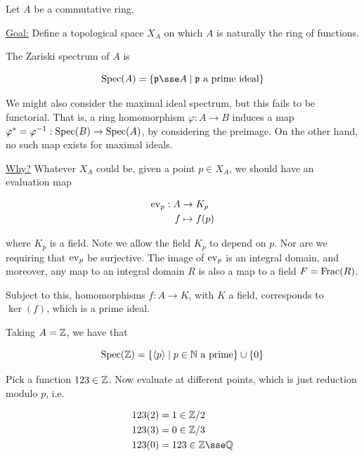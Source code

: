 \documentclass{article}
\newcommand{\set}[1]{\left\{#1\right\}}
\begin{document}
\lec

Let \(A\) be a commutative ring,

\underline{Goal:} Define a topological space \(X_A\) on which \(A\) is naturally the ring of functions.

\begin{definition}
     The Zariski spectrum of \(A\) is

    \[\Spec(A) = \set{\mfp \sse A \mid \mfp \text{ a prime ideal}}\]
\end{definition}

\begin{remark}
    We might also consider the maximal ideal spectrum, but this fails to be functorial. That is, a ring homomorphism \(\varphi: A \to B\) induces a map \(\varphi^* = \varphi^{-1} : \operatorname{Spec}(B) \to \operatorname{Spec}(A)\), by considering the preimage. On the other hand, no such map exists for maximal ideals.
\end{remark}

\underline{Why?} Whatever \(X_A\) could be, given a point \(p \in X_A\), we should have an evaluation map

\begin{align*}
    \mathrm{ev}_p : A &\to K_p \\
    f &\mapsto f(p)
\end{align*}

where \(K_p\) is a field. Note we allow the field \(K_p\) to depend on \(p\). Nor are we requiring that \(\mathrm{ev}_p\) be surjective. The image of \(\mathrm{ev}_p\) is an integral domain, and moreover, any map to an integral domain \(R\) is also a map to a field \(F = \operatorname{Frac}(R)\).

Subject to this, homomorphisms \(f : A \to K\), with \(K\) a field, corresponds to \(\ker(f)\), which is a prime ideal.

\begin{example}
    Taking \(A = \mathbb{Z}\), we have that

    \[\operatorname{Spec}(\mathbb{Z}) = \left\{\left\langle p \right\rangle \mid p \in \mathbb{N} \text{ a prime}\right\} \cup \left\{0\right\}\]

    Pick a function \(123 \in \mathbb{Z}\). Now evaluate at different points, which is just reduction modulo \(p\), i.e.

    \begin{align*}
        123(2) &= 1 \in \Z/2 \\
        123(3) &= 0 \in \Z/3 \\
        123(0) &= 123 \in \Z \sse \Q
    \end{align*}
\end{example}
\end{document}
